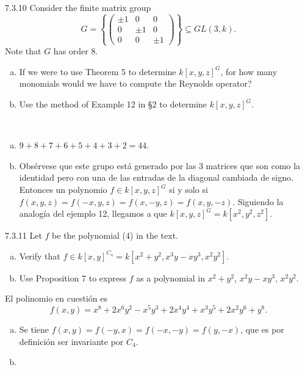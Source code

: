 \documentclass[twoside]{article}
\begin{document}
\begin{ejercicio}{7.3.10}
Consider the finite matrix group
\[
G =
\left\{\begin{pmatrix}
±1& 0 &0\\
0 &±1 &0\\
0 &0 &±1
\end{pmatrix}
\right\}
⊆ GL(3, k).
\]
Note that $G$ has order 8.
\begin{enumerate}[a.]
\item If we were to use Theorem 5 to determine $k[x, y, z]^G$, for how many monomials would
we have to compute the Reynolds operator?
\item Use the method of Example 12 in §2 to determine $k[x, y, z]^G$.
\end{enumerate}
 
\end{ejercicio}
\begin{solucion}\
\begin{enumerate}[a.]
\item $9+8+7+6+5+4+3+2=44$. 
\item Obsérvese que este grupo está generado por las 3 matrices que son como la identidad pero con una de las entradas de la diagonal cambiada de signo. Entonces un polynomio $f\in k[x, y, z]^G$ si y solo si $f(x,y,z)=f(-x,y,z)=f(x,-y,z)=f(x,y,-z)$. Siguiendo la analogía del ejemplo 12, llegamos a que $k[x, y, z]^G=k[x^2,y^2,z^2]$.
\end{enumerate}
\end{solucion}
\newpage


\begin{ejercicio}{7.3.11}
Let $f$ be the polynomial (4) in the text.
\begin{enumerate}[a.]
\item Verify that $f ∈ k[x, y]^{C_4} = k[x^2 + y^2, x^3y − xy^3, x^2y^2]$.
\item Use Proposition 7 to express $f$ as a polynomial in $x^2 + y^2$, $x^2y − xy^3$, $x^2y^2$.
\end{enumerate}
\end{ejercicio}
\begin{solucion} 
El polinomio en cuestión es $$f (x, y) = x^8 + 2x^6y^2 − x^5y^3 + 2x^4y^4 + x^3y^5 + 2x^2y^6 + y^8.$$
\begin{enumerate}[a.]
\item Se tiene $f(x,y)=f(-y,x)=f(-x,-y)=f(y,-x)$, que es por definición ser invariante por $C_4$.
\item 
\end{enumerate}
\end{solucion}
\end{document}
